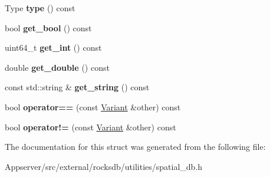 \begin{DoxyCompactItemize}
\item 
Type {\bfseries type} () const\hypertarget{structrocksdb_1_1spatial_1_1Variant_a77308f9b5314db443f6c9a732017f3d1}{}\label{structrocksdb_1_1spatial_1_1Variant_a77308f9b5314db443f6c9a732017f3d1}

\item 
bool {\bfseries get\+\_\+bool} () const\hypertarget{structrocksdb_1_1spatial_1_1Variant_adeab269cc2ae98c3911c296a2d5e08cb}{}\label{structrocksdb_1_1spatial_1_1Variant_adeab269cc2ae98c3911c296a2d5e08cb}

\item 
uint64\+\_\+t {\bfseries get\+\_\+int} () const\hypertarget{structrocksdb_1_1spatial_1_1Variant_a6426d2691a56f4330c5634c0d52b9324}{}\label{structrocksdb_1_1spatial_1_1Variant_a6426d2691a56f4330c5634c0d52b9324}

\item 
double {\bfseries get\+\_\+double} () const\hypertarget{structrocksdb_1_1spatial_1_1Variant_a599235d5bdc42c28ed7e178ea0083ebe}{}\label{structrocksdb_1_1spatial_1_1Variant_a599235d5bdc42c28ed7e178ea0083ebe}

\item 
const std\+::string \& {\bfseries get\+\_\+string} () const\hypertarget{structrocksdb_1_1spatial_1_1Variant_a6827b473bfc47b6d8ec9a0a43b680cad}{}\label{structrocksdb_1_1spatial_1_1Variant_a6827b473bfc47b6d8ec9a0a43b680cad}

\item 
bool {\bfseries operator==} (const \hyperlink{structrocksdb_1_1spatial_1_1Variant}{Variant} \&other) const\hypertarget{structrocksdb_1_1spatial_1_1Variant_ad712e89cffc7229134c3e3960d361044}{}\label{structrocksdb_1_1spatial_1_1Variant_ad712e89cffc7229134c3e3960d361044}

\item 
bool {\bfseries operator!=} (const \hyperlink{structrocksdb_1_1spatial_1_1Variant}{Variant} \&other) const\hypertarget{structrocksdb_1_1spatial_1_1Variant_a23b0d1e39639162ab5205a8f7b227760}{}\label{structrocksdb_1_1spatial_1_1Variant_a23b0d1e39639162ab5205a8f7b227760}

\end{DoxyCompactItemize}


The documentation for this struct was generated from the following file\+:\begin{DoxyCompactItemize}
\item 
Appserver/src/external/rocksdb/utilities/spatial\+\_\+db.\+h\end{DoxyCompactItemize}
